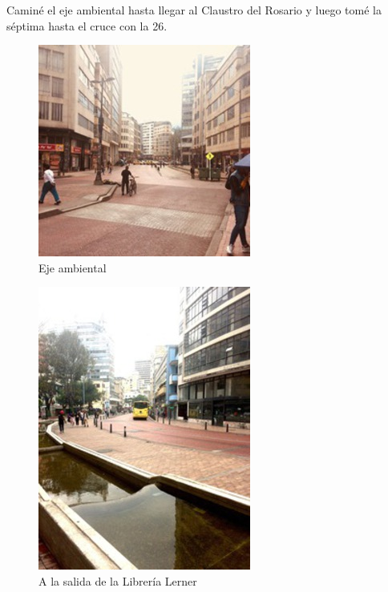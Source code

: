 \documentclass[11pt]{article}
\begin{document}
Caminé el eje ambiental hasta llegar al Claustro del Rosario y luego tomé la séptima hasta 
el cruce con la 26. 

\begin{figure}[htb]
\centering
\includegraphics[width=.9\linewidth]{./img/eje-ambiental.jpg}
\caption{Eje ambiental}
\end{figure}

\begin{figure}[htb]
\centering
\includegraphics[width=.9\linewidth]{./img/salida-lerner.jpg}
\caption{A la salida de la Librería Lerner}
\end{figure}
\end{document}
